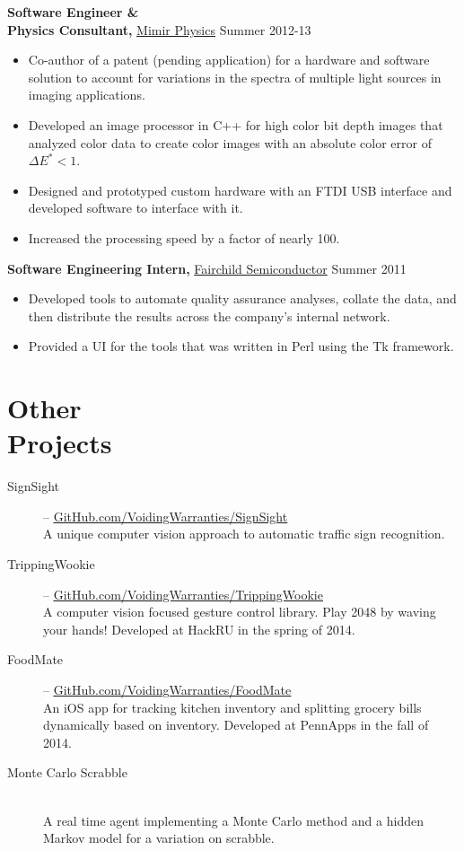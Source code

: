 \documentclass[margin]{res}
\begin{document}
\begin{minipage}{\textwidth}
\begin{resume}
{\bf Software Engineer \& \\ Physics Consultant,} \uline{Mimir Physics} \hfill Summer 2012-13
 \begin{itemize} \itemsep -2pt  %
 \item Co-author of a patent (pending application) for a hardware and software solution to account for variations in the spectra of multiple light sources in imaging applications.
 \item Developed an image processor in C++ for high color bit depth images that analyzed color data to create color images with an absolute color error of $\Delta E^* < 1$.
 \item Designed and prototyped custom hardware with an FTDI USB interface  and developed software to interface with it.
 \item Increased the processing speed by a factor of nearly 100.
 \end{itemize}

 
 
{\bf Software Engineering Intern,} \uline{Fairchild Semiconductor} \hfill  Summer 2011
\begin{itemize} \itemsep -2pt %
 \item Developed tools to automate quality assurance analyses, collate the data, and then distribute the results across the company's internal network.
 \item Provided a UI for the tools that was written in Perl using the Tk framework.
\end{itemize}

\section{Other \\ Projects}
\begin{description}
	\item[SignSight] -- \uline{\href{http://GitHub.com/VoidingWarranties/SignSight}{GitHub.com/VoidingWarranties/SignSight}} \\
		A unique computer vision approach to automatic traffic sign recognition.
	\item[TrippingWookie] -- \uline{\href{http://GitHub.com/VoidingWarranties/TrippingWookie}{GitHub.com/VoidingWarranties/TrippingWookie}} \\
		A computer vision focused gesture control library. Play 2048 by waving your hands! Developed at HackRU in the spring of 2014.
	\item[FoodMate] -- \uline{\href{http://GitHub.com/VoidingWarranties/FoodMate}{GitHub.com/VoidingWarranties/FoodMate}} \\
		An iOS app for tracking kitchen inventory and splitting grocery bills dynamically based on inventory. Developed at PennApps in the fall of 2014.
	\item[Monte Carlo Scrabble] \hfil \\
		A real time agent implementing a Monte Carlo method and a hidden Markov model for a variation on scrabble.
\end{description}


\end{resume}
\end{minipage}
\end{document}
